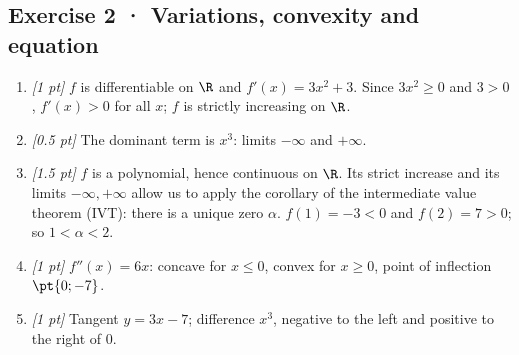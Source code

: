 \subsection*{Exercise 2 · Variations, convexity and equation}\begin{enumerate}

\item \textit{[1 pt]} $f$ is differentiable on $\R$ and $f'(x)=3x^2+3$. Since $3x^2\ge0$ and $3>0$, $f'(x)>0$ for all $x$; $f$ is strictly increasing on $\R$.

\item \textit{[0.5 pt]} The dominant term is $x^3$: limits $-\infty$ and $+\infty$.

\item \textit{[1.5 pt]} $f$ is a polynomial, hence continuous on $\R$. Its strict increase and its limits $-\infty,+\infty$ allow us to apply the corollary of the intermediate value theorem (IVT): there is a unique zero $\alpha$. $f(1)=-3<0$ and $f(2)=7>0$; so $1<\alpha<2$.

\item \textit{[1 pt]} $f''(x)=6x$: concave for $x\le0$, convex for $x\ge0$, point of inflection $\pt{0;-7}$.

\item \textit{[1 pt]} Tangent $y=3x-7$; difference $x^3$, negative to the left and positive to the right of $0$.

\end{enumerate}

